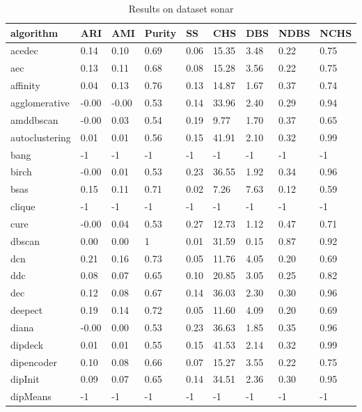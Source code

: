 \begin{table}[H]
\centering
\caption{Results on dataset sonar}
\label{S67_Table}
\begin{tabular}{|l|l|l|l|l|l|l|l|l|}
\hline
algorithm & ARI & AMI & Purity & SS & CHS & DBS & NDBS & NCHS \\
\hline
acedec & 0.14 & 0.10 & 0.69 & 0.06 & 15.35 & 3.48 & 0.22 & 0.75 \\
\hline
aec & 0.13 & 0.11 & 0.68 & 0.08 & 15.28 & 3.56 & 0.22 & 0.75 \\
\hline
affinity & 0.04 & 0.13 & 0.76 & 0.13 & 14.87 & 1.67 & 0.37 & 0.74 \\
\hline
agglomerative & -0.00 & -0.00 & 0.53 & 0.14 & 33.96 & 2.40 & 0.29 & 0.94 \\
\hline
amddbscan & -0.00 & 0.03 & 0.54 & 0.19 & 9.77 & 1.70 & 0.37 & 0.65 \\
\hline
autoclustering & 0.01 & 0.01 & 0.56 & 0.15 & 41.91 & 2.10 & 0.32 & 0.99 \\
\hline
bang & -1 & -1 & -1 & -1 & -1 & -1 & -1 & -1 \\
\hline
birch & -0.00 & 0.01 & 0.53 & 0.23 & 36.55 & 1.92 & 0.34 & 0.96 \\
\hline
bsas & 0.15 & 0.11 & 0.71 & 0.02 & 7.26 & 7.63 & 0.12 & 0.59 \\
\hline
clique & -1 & -1 & -1 & -1 & -1 & -1 & -1 & -1 \\
\hline
cure & -0.00 & 0.04 & 0.53 & 0.27 & 12.73 & 1.12 & 0.47 & 0.71 \\
\hline
dbscan & 0.00 & 0.00 & 1 & 0.01 & 31.59 & 0.15 & 0.87 & 0.92 \\
\hline
dcn & 0.21 & 0.16 & 0.73 & 0.05 & 11.76 & 4.05 & 0.20 & 0.69 \\
\hline
ddc & 0.08 & 0.07 & 0.65 & 0.10 & 20.85 & 3.05 & 0.25 & 0.82 \\
\hline
dec & 0.12 & 0.08 & 0.67 & 0.14 & 36.03 & 2.30 & 0.30 & 0.96 \\
\hline
deepect & 0.19 & 0.14 & 0.72 & 0.05 & 11.60 & 4.09 & 0.20 & 0.69 \\
\hline
diana & -0.00 & 0.00 & 0.53 & 0.23 & 36.63 & 1.85 & 0.35 & 0.96 \\
\hline
dipdeck & 0.01 & 0.01 & 0.55 & 0.15 & 41.53 & 2.14 & 0.32 & 0.99 \\
\hline
dipencoder & 0.10 & 0.08 & 0.66 & 0.07 & 15.27 & 3.55 & 0.22 & 0.75 \\
\hline
dipInit & 0.09 & 0.07 & 0.65 & 0.14 & 34.51 & 2.36 & 0.30 & 0.95 \\
\hline
dipMeans & -1 & -1 & -1 & -1 & -1 & -1 & -1 & -1 \\

\end{tabular}
\end{table}
